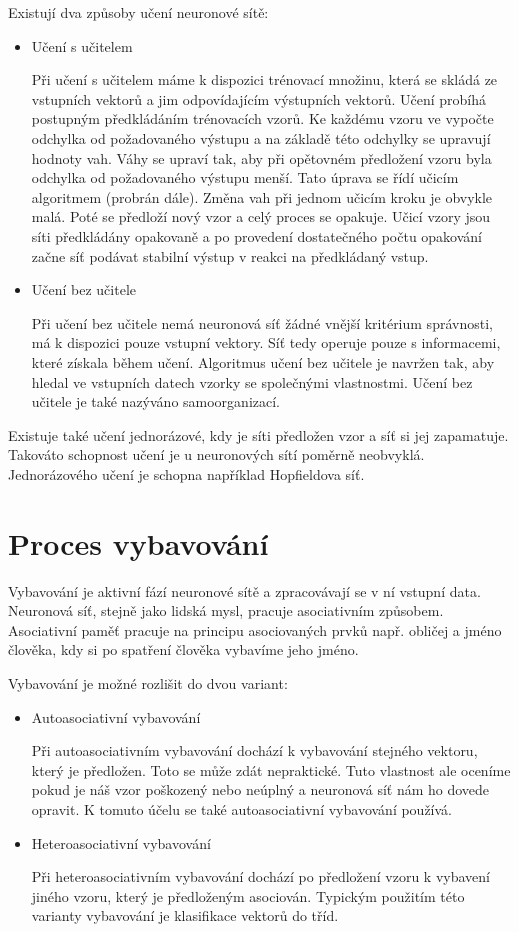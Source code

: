 \documentclass[11pt,twoside,a4paper]{book}
\begin{document}
Existují dva způsoby učení neuronové sítě:
\begin{itemize}
\item Učení s učitelem

Při učení s učitelem máme k dispozici trénovací množinu, která se skládá ze vstupních vektorů a jim odpovídajícím výstupních vektorů. Učení probíhá postupným předkládáním trénovacích vzorů. Ke každému vzoru ve vypočte odchylka od požadovaného výstupu a na základě této odchylky se upravují hodnoty vah. Váhy se upraví tak, aby při opětovném předložení vzoru byla odchylka od požadovaného výstupu menší. Tato úprava se řídí učicím algoritmem (probrán dále). Změna vah při jednom učicím kroku je obvykle malá. Poté se předloží nový vzor a celý proces se opakuje. Učicí vzory jsou síti předkládány opakovaně a po provedení dostatečného počtu opakování začne síť podávat stabilní výstup v reakci na předkládaný vstup.

\item Učení bez učitele

Při učení bez učitele nemá neuronová síť žádné vnější kritérium správnosti, má k dispozici pouze vstupní vektory. Síť tedy operuje pouze s informacemi, které získala během učení. Algoritmus učení bez učitele je navržen tak, aby hledal ve vstupních datech vzorky se společnými vlastnostmi. Učení bez učitele je také nazýváno samoorganizací.
\end{itemize}
Existuje také učení jednorázové, kdy je síti předložen vzor a síť si jej zapamatuje. Takováto schopnost učení je u neuronových sítí poměrně neobvyklá. Jednorázového učení je schopna například Hopfieldova síť.
\section{Proces vybavování}
Vybavování je aktivní fází neuronové sítě a zpracovávají se v ní vstupní data. Neuronová síť, stejně jako lidská mysl, pracuje asociativním způsobem.\citep{skripta} Asociativní paměť pracuje na principu asociovaných prvků např. obličej a jméno člověka, kdy si po spatření člověka vybavíme jeho jméno.

Vybavování je možné rozlišit do dvou variant:
\begin{itemize}
\item Autoasociativní vybavování

Při autoasociativním vybavování dochází k vybavování stejného vektoru, který je předložen. Toto se může zdát nepraktické. Tuto vlastnost ale oceníme pokud je náš vzor poškozený nebo neúplný a neuronová síť nám ho dovede opravit. K tomuto účelu se také autoasociativní vybavování používá.
\item Heteroasociativní vybavování

Při heteroasociativním vybavování dochází po předložení vzoru k vybavení jiného vzoru, který je předloženým asociován. Typickým použitím této varianty vybavování je klasifikace vektorů do tříd.
\end{itemize}
\end{document}
